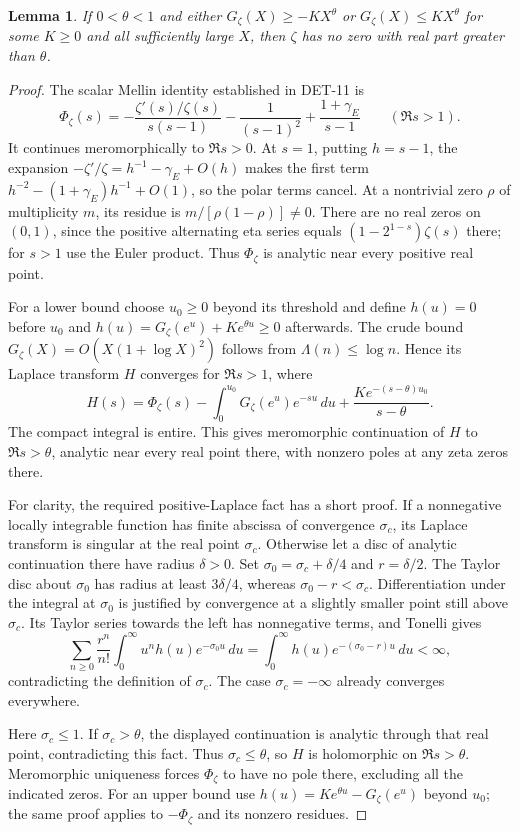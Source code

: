 \documentclass[11pt,a4paper]{article}
\newcommand{\fid}[1]{\textsf{#1}}
\newtheorem*{lemma}{Lemma}
\begin{document}
\begin{lemma}
If $0<\theta<1$ and either $G_\zeta(X)\ge-KX^\theta$ or $G_\zeta(X)\le KX^\theta$ for some $K\ge0$ and all sufficiently large $X$, then $\zeta$ has no zero with real part greater than $\theta$.
\end{lemma}
\begin{proof}
The scalar Mellin identity established in \fid{DET-11} is
\[
 \Phi_\zeta(s)=-\frac{\zeta'(s)/\zeta(s)}{s(s-1)}
 -\frac1{(s-1)^2}+\frac{1+\gamma_E}{s-1}\qquad(\Re s>1).
\]
It continues meromorphically to $\Re s>0$. At $s=1$, putting $h=s-1$, the expansion
$-\zeta'/\zeta=h^{-1}-\gamma_E+O(h)$ makes the first term
$h^{-2}-(1+\gamma_E)h^{-1}+O(1)$, so the polar terms cancel. At a nontrivial zero $\rho$ of multiplicity $m$, its residue is $m/[\rho(1-\rho)]\ne0$. There are no real zeros on $(0,1)$, since the positive alternating eta series equals $(1-2^{1-s})\zeta(s)$ there; for $s>1$ use the Euler product. Thus $\Phi_\zeta$ is analytic near every positive real point.

For a lower bound choose $u_0\ge0$ beyond its threshold and define $h(u)=0$ before $u_0$ and $h(u)=G_\zeta(e^u)+Ke^{\theta u}\ge0$ afterwards. The crude bound $G_\zeta(X)=O(X(1+\log X)^2)$ follows from $\Lambda(n)\le\log n$. Hence its Laplace transform $H$ converges for $\Re s>1$, where
\[
 H(s)=\Phi_\zeta(s)-\int_0^{u_0}G_\zeta(e^u)e^{-su}\,du
       +\frac{Ke^{-(s-\theta)u_0}}{s-\theta}.
\]
The compact integral is entire. This gives meromorphic continuation of $H$ to $\Re s>\theta$, analytic near every real point there, with nonzero poles at any zeta zeros there.

For clarity, the required positive-Laplace fact has a short proof. If a nonnegative locally integrable function has finite abscissa of convergence $\sigma_c$, its Laplace transform is singular at the real point $\sigma_c$. Otherwise let a disc of analytic continuation there have radius $\delta>0$. Set $\sigma_0=\sigma_c+\delta/4$ and $r=\delta/2$. The Taylor disc about $\sigma_0$ has radius at least $3\delta/4$, whereas $\sigma_0-r<\sigma_c$. Differentiation under the integral at $\sigma_0$ is justified by convergence at a slightly smaller point still above $\sigma_c$. Its Taylor series towards the left has nonnegative terms, and Tonelli gives
\[
 \sum_{n\ge0}\frac{r^n}{n!}
  \int_0^\infty u^nh(u)e^{-\sigma_0u}\,du
 =\int_0^\infty h(u)e^{-(\sigma_0-r)u}\,du<\infty,
\]
contradicting the definition of $\sigma_c$. The case $\sigma_c=-\infty$ already converges everywhere.

Here $\sigma_c\le1$. If $\sigma_c>\theta$, the displayed continuation is analytic through that real point, contradicting this fact. Thus $\sigma_c\le\theta$, so $H$ is holomorphic on $\Re s>\theta$. Meromorphic uniqueness forces $\Phi_\zeta$ to have no pole there, excluding all the indicated zeros. For an upper bound use $h(u)=Ke^{\theta u}-G_\zeta(e^u)$ beyond $u_0$; the same proof applies to $-\Phi_\zeta$ and its nonzero residues.
\end{proof}
\end{document}

